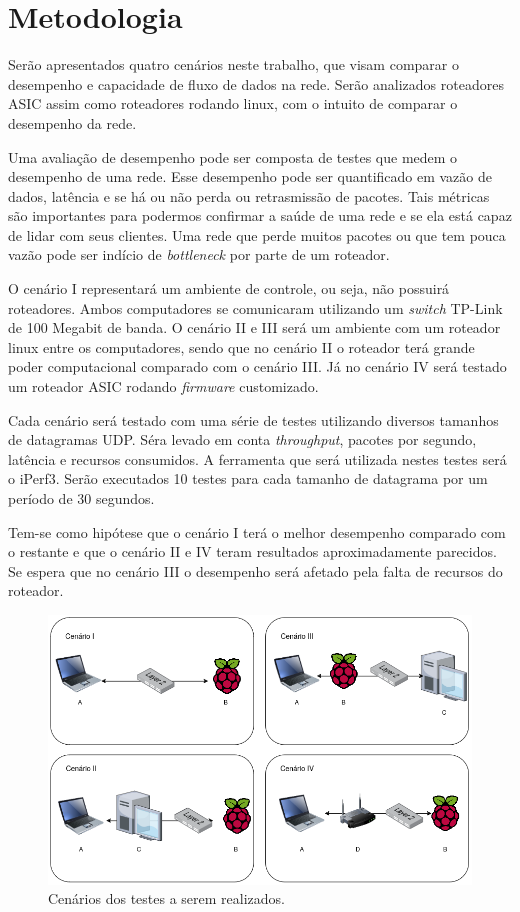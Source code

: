 \section{Metodologia} \label{Metodologia}
Serão apresentados quatro cenários neste trabalho, que visam comparar o desempenho e capacidade de fluxo de dados na rede. Serão analizados roteadores \ac{ASIC} assim como roteadores rodando linux, com o intuito de comparar o desempenho da rede. 

Uma avaliação de desempenho pode ser composta de testes que medem o desempenho de uma rede. Esse desempenho pode ser quantificado em vazão de dados, latência e se há ou não perda ou retrasmissão de pacotes. Tais métricas são importantes para podermos confirmar a saúde de uma rede e se ela está capaz de lidar com seus clientes. Uma rede que perde muitos pacotes ou que tem pouca vazão pode ser indício de \textit{bottleneck} por parte de um roteador. 

O cenário I representará um ambiente de controle, ou seja, não possuirá roteadores. Ambos computadores se comunicaram utilizando um \textit{switch} TP-Link de 100 Megabit de banda. O cenário II e III será um ambiente com um roteador linux entre os computadores, sendo que no cenário II o roteador terá grande poder computacional comparado com o cenário III. Já no cenário IV será testado um roteador \ac{ASIC} rodando \textit{firmware} customizado.

Cada cenário será testado com uma série de testes utilizando diversos tamanhos de datagramas UDP. Séra levado em conta \textit{throughput}, pacotes por segundo, latência e recursos consumidos. A ferramenta que será utilizada nestes testes será o iPerf3. Serão executados 10 testes para cada tamanho de datagrama por um período de 30 segundos.

Tem-se como hipótese que o cenário I terá o melhor desempenho comparado com o restante e que o cenário II e IV teram resultados aproximadamente parecidos. Se espera que no cenário III o desempenho será afetado pela falta de recursos do roteador.
\begin{figure}[H]
    \centering
    \includegraphics[width=0.9\linewidth]{sources/fig-cenarios.png}
    \caption{Cenários dos testes a serem realizados.}
    \label{fig:cenarios}
\end{figure}


